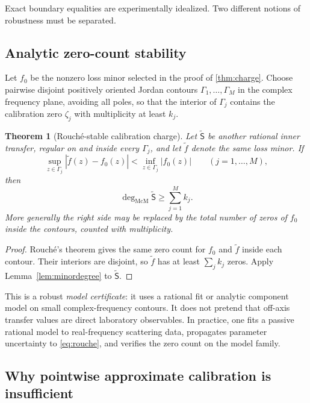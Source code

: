 \documentclass[11pt]{article}
\newtheorem{theorem}{Theorem}[section]
\theoremstyle{definition}
\theoremstyle{remark}
\newcommand{\mcdeg}{\deg_{\mathrm{McM}}}
\begin{document}
Exact boundary equalities are experimentally idealized.  Two different
notions of robustness must be separated.

\subsection{Analytic zero-count stability}

Let $f_0$ be the nonzero loss minor selected in the proof of
\cref{thm:charge}.  Choose pairwise disjoint positively oriented Jordan
contours $\Gamma_1,\ldots,\Gamma_M$ in the complex frequency plane, avoiding
all poles, so that the interior of $\Gamma_j$ contains the calibration zero
$\zeta_j$ with multiplicity at least $k_j$.

\begin{theorem}[Rouch\'e-stable calibration charge]
\label{thm:rouche}
Let $\widetilde{\mathsf S}$ be another rational inner transfer, regular on and
inside every $\Gamma_j$, and let $\widetilde f$ denote the same loss minor. If
\begin{equation}\label{eq:rouche}
 \sup_{z\in\Gamma_j}|\widetilde f(z)-f_0(z)|
 <\inf_{z\in\Gamma_j}|f_0(z)|
 \qquad(j=1,\ldots,M),
\end{equation}
then
\begin{equation}\label{eq:robustdegree}
 \mcdeg\widetilde{\mathsf S}\geq\sum_{j=1}^{M}k_j.
\end{equation}
More generally the right side may be replaced by the total number of zeros
of $f_0$ inside the contours, counted with multiplicity.
\end{theorem}

\begin{proof}
Rouch\'e's theorem \cite{Ahlfors1979} gives the same zero count for $f_0$ and
$\widetilde f$ inside each contour.  Their interiors are disjoint, so
$\widetilde f$ has at least $\sum_jk_j$ zeros.  Apply
Lemma~\ref{lem:minordegree} to $\widetilde{\mathsf S}$.
\end{proof}

This is a robust \emph{model certificate}: it uses a rational fit or analytic
component model on small complex-frequency contours.  It does not pretend
that off-axis transfer values are direct laboratory observables.  In
practice, one fits a passive rational model to real-frequency scattering
data, propagates parameter uncertainty to \eqref{eq:rouche}, and verifies the
zero count on the model family.

\subsection{Why pointwise approximate calibration is insufficient}
\end{document}
